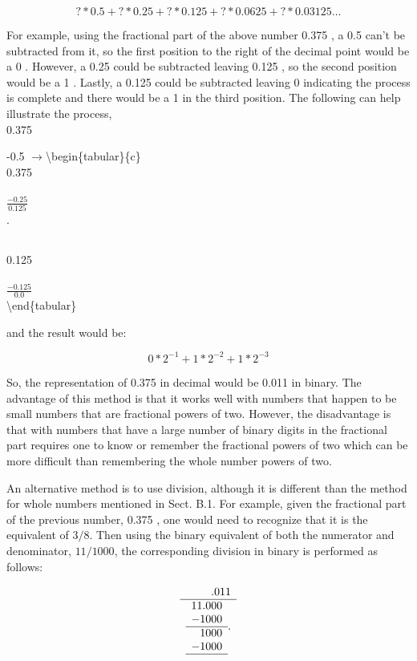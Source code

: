 \documentclass[10pt]{article}
\begin{document}
$$
? * 0.5+? * 0.25+? * 0.125+? * 0.0625+? * 0.03125 \ldots
$$

For example, using the fractional part of the above number 0.375 , a 0.5 can't be subtracted from it, so the first position to the right of the decimal point would be a 0 . However, a 0.25 could be subtracted leaving 0.125 , so the second position would be a 1 . Lastly, a 0.125 could be subtracted leaving 0 indicating the process is complete and there would be a 1 in the third position. The following can help illustrate the process,\\
0.375

-0.5 $\longrightarrow$\textbackslash begin\{tabular\}\{c\}\\
0.375 \\
\\
$\frac{-0.25}{0.125}$

 $\cdot$ \begin{tabular}{c}
\end{tabular}

0.125 \\
\\
$\frac{-0.125}{0.0}$\\
\textbackslash end\{tabular\}

and the result would be:

$$
0 * 2^{-1}+1 * 2^{-2}+1 * 2^{-3}
$$

So, the representation of 0.375 in decimal would be 0.011 in binary. The advantage of this method is that it works well with numbers that happen to be small numbers that are fractional powers of two. However, the disadvantage is that with numbers that have a large number of binary digits in the fractional part requires one to know or remember the fractional powers of two which can be more difficult than remembering the whole number powers of two.

An alternative method is to use division, although it is different than the method for whole numbers mentioned in Sect. B.1. For example, given the fractional part of the previous number, 0.375 , one would need to recognize that it is the equivalent of $3 / 8$. Then using the binary equivalent of both the numerator and denominator, $11 / 1000$, the corresponding division in binary is performed as follows:

$$
\begin{array}{r}
.011 \\
\hline \begin{array}{r}
11.000 \\
-1000 \\
\hline 1000 \\
-1000 \\
\hline
\end{array} .
\end{array}
$$
\end{document}
